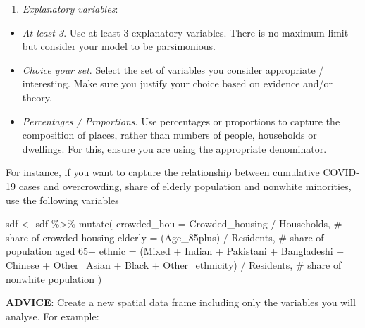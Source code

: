 \documentclass[
  letterpaper,
  krantz2]{style/krantz}
\newenvironment{Shaded}{\begin{snugshade}}{\end{snugshade}}
\newcommand{\AttributeTok}[1]{\textcolor[rgb]{0.40,0.45,0.13}{#1}}
\newcommand{\CommentTok}[1]{\textcolor[rgb]{0.37,0.37,0.37}{#1}}
\newcommand{\FunctionTok}[1]{\textcolor[rgb]{0.28,0.35,0.67}{#1}}
\newcommand{\NormalTok}[1]{\textcolor[rgb]{0.00,0.23,0.31}{#1}}
\newcommand{\OtherTok}[1]{\textcolor[rgb]{0.00,0.23,0.31}{#1}}
\newcommand{\SpecialCharTok}[1]{\textcolor[rgb]{0.37,0.37,0.37}{#1}}
\providecommand{\tightlist}{%
  \setlength{\itemsep}{0pt}\setlength{\parskip}{0pt}}\usepackage{longtable,booktabs,array}
\begin{document}
\begin{enumerate}
\def\labelenumi{\arabic{enumi}.}
\setcounter{enumi}{1}
\tightlist
\item
  \emph{Explanatory variables}:
\end{enumerate}

\begin{itemize}
\item
  \emph{At least 3}. Use at least 3 explanatory variables. There is no
  maximum limit but consider your model to be parsimonious.
\item
  \emph{Choice your set}. Select the set of variables you consider
  appropriate / interesting. Make sure you justify your choice based on
  evidence and/or theory.
\item
  \emph{Percentages / Proportions}. Use percentages or proportions to
  capture the composition of places, rather than numbers of people,
  households or dwellings. For this, ensure you are using the
  appropriate denominator.
\end{itemize}

For instance, if you want to capture the relationship between cumulative
COVID-19 cases and overcrowding, share of elderly population and
nonwhite minorities, use the following variables

\begin{Shaded}
\begin{Highlighting}[]
\NormalTok{sdf }\OtherTok{\textless{}{-}}\NormalTok{ sdf }\SpecialCharTok{\%\textgreater{}\%} \FunctionTok{mutate}\NormalTok{(}
  \AttributeTok{crowded\_hou =}\NormalTok{ Crowded\_housing }\SpecialCharTok{/}\NormalTok{ Households, }\CommentTok{\# share of crowded housing}
  \AttributeTok{elderly =}\NormalTok{ (Age\_85plus) }\SpecialCharTok{/}\NormalTok{ Residents, }\CommentTok{\# share of population aged 65+}
  \AttributeTok{ethnic =}\NormalTok{ (Mixed }\SpecialCharTok{+}\NormalTok{ Indian }\SpecialCharTok{+}\NormalTok{ Pakistani }\SpecialCharTok{+}\NormalTok{ Bangladeshi }\SpecialCharTok{+}\NormalTok{ Chinese }\SpecialCharTok{+}\NormalTok{ Other\_Asian }\SpecialCharTok{+}\NormalTok{ Black }\SpecialCharTok{+}\NormalTok{ Other\_ethnicity) }\SpecialCharTok{/}\NormalTok{ Residents, }\CommentTok{\# share of nonwhite population}
\NormalTok{)}
\end{Highlighting}
\end{Shaded}

\textbf{ADVICE}: Create a new spatial data frame including only the
variables you will analyse. For example:
\end{document}

